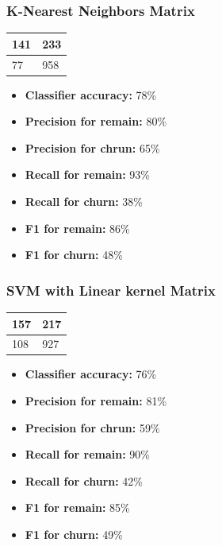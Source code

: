\documentclass[12pt]{article}
\begin{document}
\subsubsection{K-Nearest Neighbors Matrix}
\begin{table}[ht]
  \large
  \centering
\begin{tabular}{|l|l|}
  \hline
  141 & 233\\
  \hline
  77 & 958\\
  \hline
\end{tabular}
\end{table}
\begin{itemize}
  \item \textbf{Classifier accuracy:} 78\%
  \item \textbf{Precision for remain:} 80\%
  \item \textbf{Precision for chrun:} 65\%
  \item \textbf{Recall for remain:} 93\%
  \item \textbf{Recall for churn:} 38\%
  \item \textbf{F1 for remain:} 86\%
  \item \textbf{F1 for churn:} 48\%
\end{itemize}

\vspace{\baselineskip}

\subsubsection{SVM with Linear kernel Matrix}
\begin{table}[ht]
  \large
  \centering
\begin{tabular}{|l|l|}
  \hline
  157 & 217\\
  \hline
  108 & 927\\
  \hline
\end{tabular}
\end{table}
\begin{itemize}
  \item \textbf{Classifier accuracy:} 76\%
  \item \textbf{Precision for remain:} 81\%
  \item \textbf{Precision for chrun:} 59\%
  \item \textbf{Recall for remain:} 90\%
  \item \textbf{Recall for churn:} 42\%
  \item \textbf{F1 for remain:} 85\%
  \item \textbf{F1 for churn:} 49\%
\end{itemize}
\end{document}
